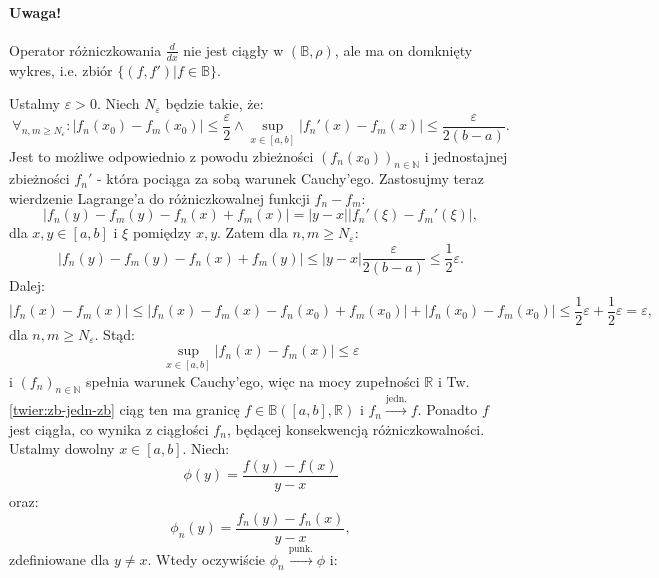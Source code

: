 \documentclass{article}
\newcounter{defi}
\numberwithin{defi}{section}
\numberwithin{defi}{section}
\newcommand{\R}{\mathbb{R}}
\newcommand{\N}{\mathbb{N}}
\newcommand{\B}{\mathbb{B}}
\providecommand{\eps}{\varepsilon}
\providecommand{\half}{\frac{1}{2}}
\renewcommand{\geq}{\geqslant}
\renewcommand{\leq}{\leqslant}
\newcommand{\ciag}[1]{(#1_{n})_{n \in \N}}
\newcommand{\topunk}{\xrightarrow{\text{punk.}}}
\newcommand{\tojedn}{\xrightarrow{\text{jedn.}}}
\begin{document}
\paragraph{Uwaga!} Operator różniczkowania $\frac{d}{dx}$ nie jest ciągły w $(\B, \rho)$, ale ma on domknięty wykres, i.e. zbiór $\{(f, f') | f \in \B \}$.

\begin{dow}
    Ustalmy $\eps > 0$. Niech $N_\eps$ będzie takie, że: \begin{equation}
        \forall_{n, m \geq N_\eps}: | f_n(x_0) - f_m(x_0) | \leq \frac{\eps}{2} \wedge \sup_{x \in [a, b]} |f_n' (x) - f_m(x) | \leq \frac{\eps}{2(b-a)}.
    \end{equation} Jest to możliwe odpowiednio z powodu zbieżności $(f_n(x_0))_{n \in \N}$ i jednostajnej zbieżności $f_n'$ - która pociąga za sobą warunek Cauchy'ego. Zastosujmy teraz wierdzenie Lagrange'a do różniczkowalnej funkcji $f_n - f_m$: \begin{equation*}
        | f_n(y) - f_m(y) - f_n(x) + f_m(x)| = |y - x| | f_n'(\xi) - f_m'(\xi)|,
    \end{equation*} dla $x, y \in [a,b]$ i $\xi$ pomiędzy $x, y$. Zatem dla $n, m \geq N_\eps$: \begin{equation*}
        | f_n(y) - f_m(y) - f_n(x) + f_m(y)| \leq | y - x| \frac{\eps}{2(b-a)} \leq \half \eps.
    \end{equation*} Dalej: \begin{equation}
        |f_n(x) - f_m(x)| \leq |f_n(x) - f_m(x) - f_n(x_0) + f_m(x_0)| + |f_n(x_0) - f_m(x_0)| \leq \half \eps + \half \eps = \eps, 
    \end{equation} dla $n, m \geq N_\eps$. Stąd: \begin{equation*}
        \sup_{x \in [a, b]} |f_n(x) - f_m(x)| \leq \eps
    \end{equation*} i $\ciag{f}$ spełnia warunek Cauchy'ego, więc na mocy zupełności $\R$ i Tw. \ref*{twier:zb-jedn-zb} ciąg ten ma granicę $f \in \B([a, b], \R)$ i $f_n \tojedn f$. Ponadto $f$ jest ciągła, co wynika z ciągłości $f_n$, będącej konsekwencją różniczkowalności. \\
    Ustalmy dowolny $x \in [a, b]$. Niech: \begin{equation*}
        \phi(y) = \frac{f(y) - f(x)}{y - x}
    \end{equation*} oraz: \begin{equation*}
        \phi_n(y) = \frac{f_n(y) - f_n(x)}{y - x},
    \end{equation*} zdefiniowane dla $y \neq x$. Wtedy oczywiście $\phi_n \topunk \phi$ i: \begin{equation*}

\end{equation*}
\end{dow}
\end{document}
